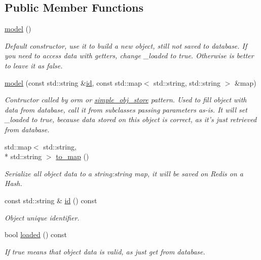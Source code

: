 \subsection*{Public Member Functions}
\begin{DoxyCompactItemize}
\item 
\hypertarget{classredis3m_1_1patterns_1_1model_a844e576743580f8cb8edb5fd17426123}{\hyperlink{classredis3m_1_1patterns_1_1model_a844e576743580f8cb8edb5fd17426123}{model} ()}\label{classredis3m_1_1patterns_1_1model_a844e576743580f8cb8edb5fd17426123}

\begin{DoxyCompactList}\small\item\em Default constructor, use it to build a new object, still not saved to database. If you need to access data with getters, change \-\_\-loaded to true. Otherwise is better to leave it as false. \end{DoxyCompactList}\item 
\hyperlink{classredis3m_1_1patterns_1_1model_a68f1f52944af53408147818908ce5b96}{model} (const std\-::string \&\hyperlink{classredis3m_1_1patterns_1_1model_ac2b3983890b78356d9079a0cba78c5be}{id}, const std\-::map$<$ std\-::string, std\-::string $>$ \&map)
\begin{DoxyCompactList}\small\item\em Contructor called by orm or \hyperlink{classredis3m_1_1patterns_1_1simple__obj__store}{simple\-\_\-obj\-\_\-store} pattern. Used to fill object with data from database, call it from subclasses passing parameters as-\/is. It will set \-\_\-loaded to true, because data stored on this object is correct, as it's just retrieved from database. \end{DoxyCompactList}\item 
std\-::map$<$ std\-::string, \\*
std\-::string $>$ \hyperlink{classredis3m_1_1patterns_1_1model_ae5060af845197891c8f78240084e0463}{to\-\_\-map} ()
\begin{DoxyCompactList}\small\item\em Serialize all object data to a string\-:string map, it will be saved on Redis on a Hash. \end{DoxyCompactList}\item 
const std\-::string \& \hyperlink{classredis3m_1_1patterns_1_1model_ac2b3983890b78356d9079a0cba78c5be}{id} () const 
\begin{DoxyCompactList}\small\item\em Object unique identifier. \end{DoxyCompactList}\item 
bool \hyperlink{classredis3m_1_1patterns_1_1model_ac2ad745d637383d2cc42b6a1e15a82d6}{loaded} () const 
\begin{DoxyCompactList}\small\item\em If true means that object data is valid, as just get from database. \end{DoxyCompactList}\end{DoxyCompactItemize}
